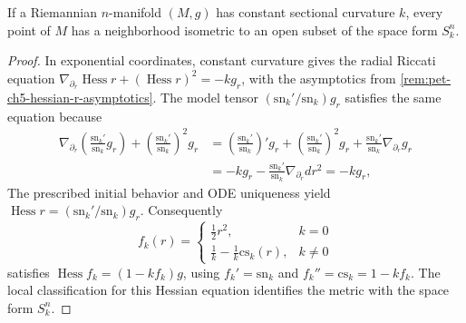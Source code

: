 \begin{theorem}
  \label{thm:pet-ch5-riemann-constant-curvature-local}
  If a Riemannian $n$-manifold $(M,g)$ has constant sectional curvature $k$, every
  point of $M$ has a neighborhood isometric to an open subset of the space form
  $S^n_k$.
\end{theorem}
\begin{proof}
  \sketch
  In exponential coordinates, constant curvature gives the radial Riccati equation
  $\nabla_{\partial_r}\operatorname{Hess}r+(\operatorname{Hess}r)^2=-kg_r$, with
  the asymptotics from \cref{rem:pet-ch5-hessian-r-asymptotics}.  The model
  tensor $(\mathrm{sn}_k'/\mathrm{sn}_k)g_r$ satisfies the same equation because
  \begin{align*}
    \nabla_{\partial_r}\!\left(\frac{\mathrm{sn}_k'}{\mathrm{sn}_k}g_r\right)
    +\left(\frac{\mathrm{sn}_k'}{\mathrm{sn}_k}\right)^2g_r
    &=\left(\frac{\mathrm{sn}_k'}{\mathrm{sn}_k}\right)'g_r
    +\left(\frac{\mathrm{sn}_k'}{\mathrm{sn}_k}\right)^2g_r
    +\frac{\mathrm{sn}_k'}{\mathrm{sn}_k}\nabla_{\partial_r}g_r\\
    &=-kg_r-\frac{\mathrm{sn}_k'}{\mathrm{sn}_k}\nabla_{\partial_r}dr^2=-kg_r,
  \end{align*}
  The prescribed initial behavior and ODE uniqueness yield
  $\operatorname{Hess}r=(\mathrm{sn}_k'/\mathrm{sn}_k)g_r$.  Consequently
  \[
    f_k(r)=\begin{cases}\tfrac12r^2,&k=0\\ \tfrac1k-\tfrac1k\mathrm{cs}_k(r),&k\ne0\end{cases}
  \]
  satisfies $\operatorname{Hess}f_k=(1-kf_k)g$, using
  $f_k'=\mathrm{sn}_k$ and $f_k''=\mathrm{cs}_k=1-kf_k$.  The local classification
  for this Hessian equation identifies the metric with the space form $S_k^n$.
\end{proof}


